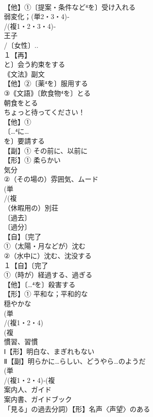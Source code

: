 \documentclass[8pt]{extreport}
\begin{document}
\begin{CJK}{UTF8}{min}
\\	【他】①〔提案・条件など⁴を〕受け入れる
\\	弱変化；(単2・3・4)‐
\\	/(複1・2・3・4)‐
\\	王子 
\\	/〔女性〕..
\\	１【再】
\\	と〕会う約束をする
\\	｟文法｠副文 
\\	【他】②〔薬⁴を〕服用する 
\\	③｟文語｠〔飲食物⁴を〕とる　
\\	朝食をとる
\\	ちょっと待ってください！
\\	【他】①
\\	〔…⁴に…
\\	を〕要請する
\\	【副】① その前に、以前に 
\\	【形】① 柔らかい 
\\	気分 
\\	②（その場の）雰囲気、ムード
\\	(単
\\	/(複
\\	（休暇用の）別荘 
\\	〔過去〕
\\	〔過分〕
\\	【自】〔完了
\\	①（太陽・月などが）沈む 
\\	②（水中に）沈む、沈没する
\\	１【自】〔完了
\\	①（時が）経過する、過ぎる 
\\	【他】〔…⁴を〕殺害する 
\\	【形】① 平和な；平和的な 
\\	穏やかな
\\	(単
\\	/(複1・2・4)
\\	(複
\\	慣習、習慣 
\\	Ⅰ【形】明白な、まぎれもない 
\\	Ⅱ【副】明らかに…らしい、どうやら…のようだ
\\	(単
\\	/(複1・2・4)‐(複
\\	案内人、ガイド 
\\	案内書、ガイドブック
\\	「見る」の過去分詞）【形】名声〈声望〉のある 

\end{CJK}
\end{document}
